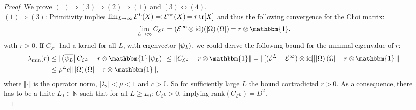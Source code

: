 \begin{proof}
We prove $(1) \Rightarrow (3) \Rightarrow (2) \Rightarrow (1)$ and $(3) \Leftrightarrow (4)$. \\

\noindent $(1) \Rightarrow (3)$: Primitivity implies $\lim_{L \to \infty} \mathcal{E}^L(X) \eqqcolon \mathcal{E}^{\infty}(X) = r \tr[X]$ and thus the following convergence for the Choi matrix:
\begin{equation}
	\lim_{L \to \infty} C_{\mathcal{E}^L} = (\mathcal{E}^{\infty} \otimes \mathrm{id})(\tket{\Omega} \tbra{\Omega}) = r \otimes \mathbbm{1},
\end{equation}
with $r > 0$. If $C_{\mathcal{E}^L}$ had a kernel for all $L$, with eigenvector $\left| \psi_L \right)$, we could derive the following bound for the minimal eigenvalue of $r$:
\begin{align}
\begin{split}
	\lambda_{\mathrm{min}}(r) &\leq \vert \tbra{\overline{\psi_L}} C_{\mathcal{E}^L} - r \otimes \mathbbm{1} \tket{\psi_L} \vert \leq \Vert C_{\mathcal{E}^L} - r \otimes \mathbbm{1} \Vert = \Vert [(\mathcal{E}^L - \mathcal{E}^{\infty}) \otimes \mathrm{id}] [\tket{\Omega} \tbra{\Omega} - r \otimes \mathbbm{1}] \Vert \\
	& \leq \mu^L c \Vert \tket{\Omega} \tbra{\Omega} - r \otimes \mathbbm{1} \Vert,
\end{split}
\end{align}
where $\Vert \cdot \Vert$ is the operator norm, $\vert \lambda_2 \vert < \mu < 1$ and $c > 0$. So for sufficiently large $L$ the bound contradicted $r > 0$. As a consequence, there has to be a finite $L_0 \in \mathbb{N}$ such that for all $L \geq L_0$: $C_{\mathcal{E}^L} > 0$, implying $\mathrm{rank}(C_{\mathcal{E}^L}) = D^2$. \\


\end{proof}
